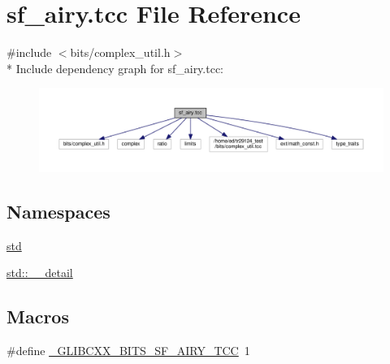 \hypertarget{sf__airy_8tcc}{}\section{sf\+\_\+airy.\+tcc File Reference}
\label{sf__airy_8tcc}
{\ttfamily \#include $<$bits/complex\+\_\+util.\+h$>$}\\*
Include dependency graph for sf\+\_\+airy.\+tcc\+:
\nopagebreak
\begin{figure}[H]
\begin{center}
\leavevmode
\includegraphics[width=350pt]{sf__airy_8tcc__incl}
\end{center}
\end{figure}
\subsection*{Namespaces}
\begin{DoxyCompactItemize}
\item 
 \hyperlink{namespacestd}{std}
\item 
 \hyperlink{namespacestd_1_1____detail}{std\+::\+\_\+\+\_\+detail}
\end{DoxyCompactItemize}
\subsection*{Macros}
\begin{DoxyCompactItemize}
\item 
\#define \hyperlink{sf__airy_8tcc_a2368d5b1edfb2e14f2c283d87ab89943}{\+\_\+\+G\+L\+I\+B\+C\+X\+X\+\_\+\+B\+I\+T\+S\+\_\+\+S\+F\+\_\+\+A\+I\+R\+Y\+\_\+\+T\+C\+C}~1
\end{DoxyCompactItemize}

